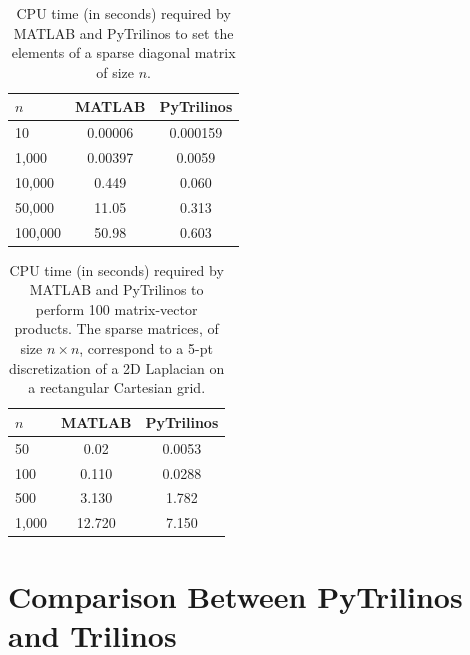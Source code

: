 \documentclass[acmtocl]{acmtrans2m}
\begin{document}
\begin{table}
  \begin{center}
    \begin{tabular}{| l | c | c |}
      \hline
      $n$ & MATLAB & PyTrilinos \\
      \hline
      \hline
      10      & 0.00006 & 0.000159 \\
      1,000   & 0.00397 & 0.0059   \\
      10,000  & 0.449   & 0.060    \\
      50,000  & 11.05   & 0.313    \\
      100,000 & 50.98   & 0.603    \\
      \hline
    \end{tabular}
    \caption{CPU time (in seconds) required by MATLAB and PyTrilinos
      to set the elements of a sparse diagonal matrix of size $n$.}
    \label{tab:matlab_sparse}
  \end{center}
\end{table}

\begin{table}
  \begin{center}
    \begin{tabular}{| l | c | c |}
      \hline
      $n$ & MATLAB & PyTrilinos \\
      \hline
      \hline
      50     & 0.02    & 0.0053   \\
      100    & 0.110   & 0.0288   \\
      500    & 3.130   & 1.782   \\
      1,000  & 12.720  & 7.150    \\
      \hline
    \end{tabular}
    \caption{CPU time (in seconds) required by MATLAB and PyTrilinos
      to perform 100 matrix-vector products. The sparse matrices, of size $n
        \times n$, correspond to a 5-pt discretization of a 2D Laplacian on a
        rectangular Cartesian grid.}
    \label{tab:matlab_matvec}
  \end{center}
\end{table}

\section{Comparison Between PyTrilinos and Trilinos}
\label{sec:comparison_trilinos}
\end{document}

